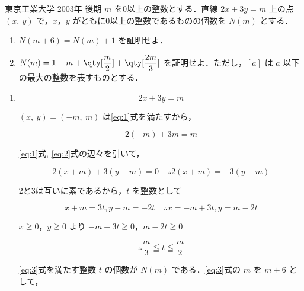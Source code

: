 \documentclass[a4paper]{ltjsarticle}
\begin{document}

\begin{itembox}[l]{東京工業大学 2003年 後期}
    $m$ を0以上の整数とする．直線 $2x+3y=m$ 上の点 $(x,\ y)$ で，$x$，$y$ がともに0以上の整数であるものの個数を $N(m)$ とする．

    \begin{enumerate}[label=(\arabic*)]
        \item $N(m+6)=N(m)+1$ を証明せよ．
        \item $N(m)=1-m+\qty[\dfrac{m}{2}]+\qty[\dfrac{2m}{3}]$ を証明せよ．ただし，$[a]$ は $a$ 以下の最大の整数を表すものとする．
    \end{enumerate}
\end{itembox}

\begin{enumerate}[label=(\arabic*)]
    \item
          \begin{equation}
              2x+3y=m\label{eq:1}
          \end{equation}

          $(x,\ y)=(-m,\ m)$ は\eqref{eq:1}式を満たすから，

          \begin{equation}
              2(-m)+3m=m\label{eq:2}
          \end{equation}

          \eqref{eq:1}式, \eqref{eq:2}式の辺々を引いて，

          \begin{equation*}
              2(x+m)+3(y-m)=0 \quad \therefore 2(x+m)=-3(y-m)
          \end{equation*}

          2と3は互いに素であるから，$t$ を整数として

          \begin{equation*}
              x+m=3t, y-m=-2t \quad \therefore x=-m+3t, y=m-2t
          \end{equation*}

          $x\geqq 0$，$y\geqq 0$ より $-m+3t\geqq 0$，$m-2t\geqq 0$

          \begin{equation}
              \therefore \frac{m}{3}\leqq t\leqq \frac{m}{2}\label{eq:3}
          \end{equation}

          \eqref{eq:3}式を満たす整数 $t$ の個数が $N(m)$ である．\eqref{eq:3}式の $m$ を $m+6$ として，


\end{enumerate}
\end{document}
